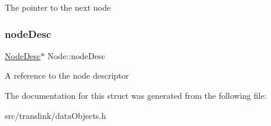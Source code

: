 The pointer to the next node \mbox{\label{structNode_aa147c0f286a8b3913347af793b6c8a57}} 
\subsubsection{\texorpdfstring{node\+Desc}{nodeDesc}}
{\footnotesize\ttfamily \hyperlink{structNodeDesc}{Node\+Desc}$\ast$ Node\+::node\+Desc}

A reference to the node descriptor 

The documentation for this struct was generated from the following file\+:\begin{DoxyCompactItemize}
\item 
src/translink/data\+Objects.\+h\end{DoxyCompactItemize}
